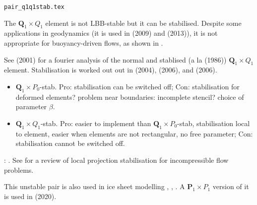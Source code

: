 
\label{ss:pairq1q1stab}
\begin{flushright} {\tiny {\color{gray} \tt pair\_q1q1stab.tex}} \end{flushright}

\begin{minipage}[t]{0.5\textwidth}

\end{minipage}
\begin{minipage}[t]{0.5\textwidth}

\end{minipage}

The ${\bm Q}_1\times Q_1$ element is not LBB-stable but it can be stabilised. Despite
some applications in geodynamics (it is used in \textcite{bugs09} (2009) 
and \textcite{busa13} (2013)), it is not appropriate for buoyancy-driven flows, 
as shown in \textcite{thba22}.

See \textcite{nosi01} (2001) for a fourier analysis of the normal 
and stablised (a la \textcite{hufb86} (1986)) ${\bm Q}_1\times Q_1$ element.
Stabilisation is worked out out in \textcite{dobo04} (2004), \textcite{bodg06} (2006), 
and \textcite{bodo06} (2006).

\begin{itemize}
\item 
${\bm Q}_1\times P_0$-stab. Pro: stabilisation can be switched off; Con: stabilisation for deformed elements? 
problem near boundaries: incomplete stencil? choice of parameter $\beta$.
\item 
${\bm Q}_1\times Q_1$-stab. Pro: easier to implement than ${\bm Q}_1\times P_0$-stab, stabilisation local to element, 
easier when elements are not rectangular, no free parameter; Con: stabilisation cannot be switched off.
\end{itemize}

\Literature: \textcite{shry78,temr92,tezd92,grcc95,idsn95,knto00,fros07,lihc09}. 
See \textcite{brlu09} for a review of local projection stabilisation for incompressible flow problems. 

This unstable pair is also used in ice sheet modelling \textcite{heah18} , \textcite{zhjg11}, 
\textcite{zwgg07}. A ${\bm P}_1\times P_1$ version of it is used in \textcite{kahp20} (2020).




